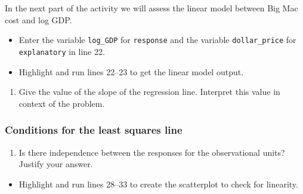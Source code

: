 \documentclass[
]{report}
\newenvironment{Shaded}{\begin{snugshade}}{\end{snugshade}}
\newcommand{\AttributeTok}[1]{\textcolor[rgb]{0.13,0.29,0.53}{#1}}
\newcommand{\CommentTok}[1]{\textcolor[rgb]{0.56,0.35,0.01}{\textit{#1}}}
\newcommand{\DecValTok}[1]{\textcolor[rgb]{0.00,0.00,0.81}{#1}}
\newcommand{\FunctionTok}[1]{\textcolor[rgb]{0.13,0.29,0.53}{\textbf{#1}}}
\newcommand{\NormalTok}[1]{#1}
\newcommand{\OtherTok}[1]{\textcolor[rgb]{0.56,0.35,0.01}{#1}}
\newcommand{\SpecialCharTok}[1]{\textcolor[rgb]{0.81,0.36,0.00}{\textbf{#1}}}
\providecommand{\tightlist}{%
  \setlength{\itemsep}{0pt}\setlength{\parskip}{0pt}}
\begin{document}
In the next part of the activity we will assess the linear model between Big Mac cost and log GDP.

\begin{itemize}
\item
  Enter the variable \texttt{log\_GDP} for \texttt{response} and the variable \texttt{dollar\_price} for \texttt{explanatory} in line 22.
\item
  Highlight and run lines 22--23 to get the linear model output.
\end{itemize}

\begin{Shaded}
\end{Shaded}

\begin{enumerate}
\def\labelenumi{\arabic{enumi}.}
\setcounter{enumi}{3}
\tightlist
\item
  Give the value of the slope of the regression line. Interpret this value in context of the problem.
  \vspace{0.6in}
\end{enumerate}

\subsubsection*{Conditions for the least squares line}\label{conditions-for-the-least-squares-line-1}

\begin{enumerate}
\def\labelenumi{\arabic{enumi}.}
\setcounter{enumi}{4}
\tightlist
\item
  Is there independence between the responses for the observational units? Justify your answer.
\end{enumerate}

\vspace{0.3in}

\begin{itemize}
\tightlist
\item
  Highlight and run lines 28--33 to create the scatterplot to check for linearity.
\end{itemize}
\end{document}
